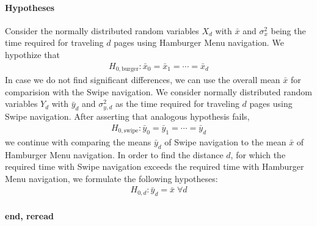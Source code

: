 \documentclass{sig-alternate-05-2015}
\begin{document}
\paragraph{Hypotheses}
Consider the normally distributed random variables $X_d$ with $\bar x$ and $\sigma_x^2$ being the time required for traveling $d$ pages using Hamburger Menu navigation.
We hypothize that
\begin{align*}
  H_{0, \text{burger}}: \bar x_0 = \bar x_1 = \cdots = \bar x_d
\end{align*}
In case we do not find significant differences,
we can use the overall mean $\bar x$
for comparision with the Swipe navigation.
We consider normally distributed random variables $Y_d$ with $\bar y_d$ and $\sigma_{y,d}^2$
as the time required for traveling $d$ pages using Swipe navigation.
After asserting that analogous hypothesis fails,
\begin{align*}
  H_{0, \text{swipe}}: \bar y_0 = \bar y_1= \cdots = \bar y_d
\end{align*}
we continue with comparing the means $\bar y_d$ of Swipe navigation to the mean $\bar x$ of Hamburger Menu navigation.
In order to find the distance $d$, for which the required time with Swipe navigation exceeds
the required time with Hamburger Menu navigation,
we formulate the following hypotheses:
\begin{align*}
  H_{0,d} : \bar y_d = \bar x \;\forall d
\end{align*}
\paragraph{end, reread}
\end{document}
